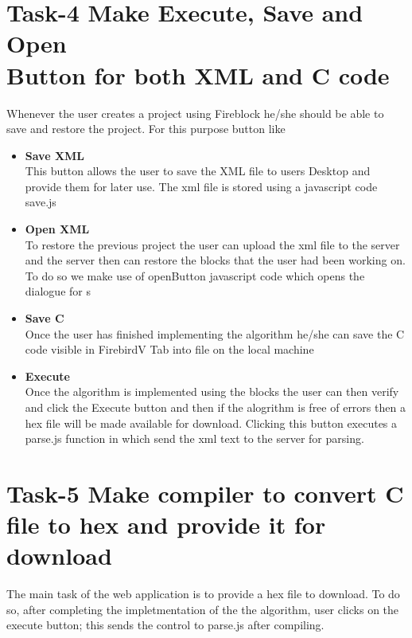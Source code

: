 \documentclass[a4paper,10pt]{report}
\begin{document}
\section{Task-4 Make Execute, Save and Open \\ Button for both XML and C code}
   Whenever the user creates a project using Fireblock he/she should be able to save and restore the project. For this purpose button like
   \begin{itemize}
     \item \textbf{Save XML}\\
      This button allows the user to save the XML file to users Desktop and provide them for later use.
      The xml file is stored using a javascript code save.js
     \item \textbf{Open XML}\\
     To restore the previous project the user can upload the xml file to the server and the server then can restore the blocks that the user had been working on.
     To do so we make use of openButton javascript code which opens the dialogue for s
     \item \textbf{Save C}\\
     Once the user has finished implementing the algorithm he/she can save the C code visible in FirebirdV Tab into file on the local machine
     \item \textbf{Execute}\\
     Once the algorithm is implemented using the blocks the user can then verify and click the Execute button and then if the alogrithm is free of errors
     then a hex file will be made available for download. Clicking this button executes a parse.js function in which send the xml text to the server for parsing.
   \end{itemize}
\newpage
\section{Task-5 Make compiler to convert C file to hex and provide it for download} 
    The main task of the web application is to provide a hex file to download. To do so, after completing the impletmentation of the the algorithm,
    user clicks on the execute button; this sends the control to parse.js after compiling. 
\end{document}
